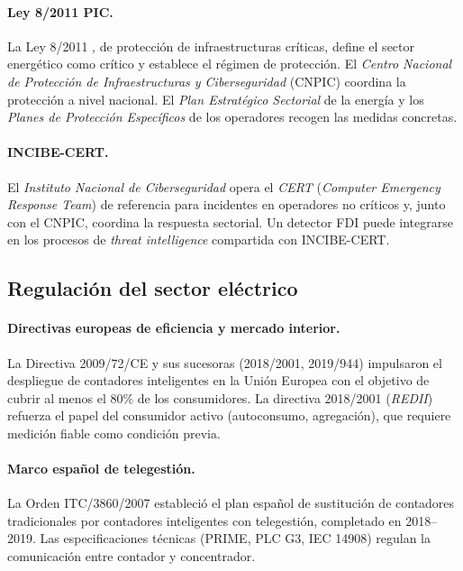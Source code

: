 \paragraph{Ley 8/2011 PIC.} La Ley 8/2011 \cite{ley8_2011_pic}, de protección de infraestructuras críticas, define el sector energético como crítico y establece el régimen de protección. El \textit{Centro Nacional de Protección de Infraestructuras y Ciberseguridad} (CNPIC) coordina la protección a nivel nacional. El \emph{Plan Estratégico Sectorial} de la energía y los \emph{Planes de Protección Específicos} de los operadores recogen las medidas concretas.

\paragraph{INCIBE-CERT.} El \emph{Instituto Nacional de Ciberseguridad} opera el \emph{CERT} (\textit{Computer Emergency Response Team}) de referencia para incidentes en operadores no críticos y, junto con el CNPIC, coordina la respuesta sectorial. Un detector FDI puede integrarse en los procesos de \emph{threat intelligence} compartida con INCIBE-CERT.

\subsection{Regulación del sector eléctrico}

\paragraph{Directivas europeas de eficiencia y mercado interior.} La Directiva 2009/72/CE y sus sucesoras (2018/2001, 2019/944) impulsaron el despliegue de contadores inteligentes en la Unión Europea con el objetivo de cubrir al menos el 80\% de los consumidores. La directiva 2018/2001 \cite{red_iii} (\emph{REDII}) refuerza el papel del consumidor activo (autoconsumo, agregación), que requiere medición fiable como condición previa.

\paragraph{Marco español de telegestión.} La Orden ITC/3860/2007 \cite{itc3860} estableció el plan español de sustitución de contadores tradicionales por contadores inteligentes con telegestión, completado en 2018--2019. Las especificaciones técnicas (PRIME, PLC G3, IEC 14908) regulan la comunicación entre contador y concentrador.

